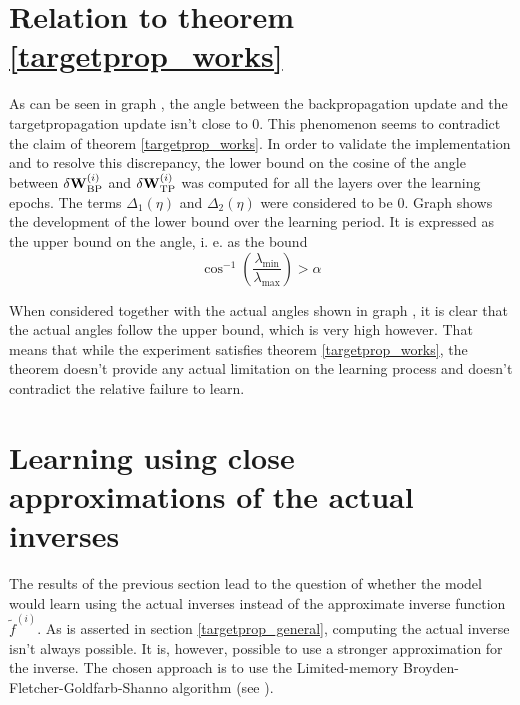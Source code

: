 \section{Relation to theorem \ref{targetprop_works}}
As can be seen in graph , the angle between the backpropagation update and the targetpropagation update isn't close to 0. This phenomenon seems to contradict the claim of theorem \ref{targetprop_works}. In order to validate the implementation and to resolve this discrepancy, the lower bound on the cosine of the angle between \( \delta \mathbf{W}_{\mathrm{BP}}^{(i)} \) and \( \delta \mathbf{W}_{\mathrm{TP}}^{(i)} \) was computed for all the layers over the learning epochs. The terms \( \Delta_1 \left( \eta \right) \) and \(  \Delta_2 \left( \eta \right) \) were considered to be 0. Graph  shows the development of the lower bound over the learning period. It is expressed as the upper bound on the angle, i. e. as the bound
\[ \cos^{-1} \left( \frac{\lambda_{\mathrm{min}}}{\lambda_{\mathrm{max}}} \right) > \alpha \]

When considered together with the actual angles shown in graph , it is clear that the actual angles follow the upper bound, which is very high however. That means that while the experiment satisfies theorem \ref{targetprop_works}, the theorem doesn't provide any actual limitation on the learning process and doesn't contradict the relative failure to learn.

\section{Learning using close approximations of the actual inverses}
The results of the previous section lead to the question of whether the model would learn using the actual inverses instead of the approximate inverse function \( \widetilde{f}^{(i)} \). As is asserted in section \ref{targetprop_general}, computing the actual inverse isn't always possible. It is, however, possible to use a stronger approximation for the inverse. The chosen approach is to use the Limited-memory Broyden-Fletcher-Goldfarb-Shanno algorithm (see \cite{liu_limited_1989}).

